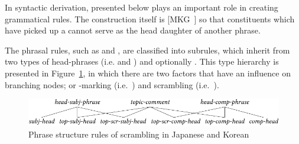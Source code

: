 
In syntactic derivation,  presented below plays an
important role in creating grammatical rules. The
construction itself is \mbox{[MKG ]} so that constituents
which have picked up a  cannot serve as the head daughter
of another  phrase.




\noindent The phrasal rules, such as  and
, are classified into subrules, which inherit from
two types of head-phrases (i.e.  and
) and optionally . This type
hierarchy is presented in Figure~\ref{fig:top:scr}, in which there are
two factors that have an influence on branching nodes; \wa or
\onun-marking (i.e.\ ) and scrambling (i.e.\ ).


\begin{figure}[!t]
\begin{center} 
\includegraphics[width=.9\textwidth]{pdf/top-scr.pdf}
\caption{Phrase structure rules of scrambling in Japanese and Korean}
\label{fig:top:scr}
\end{center}
\end{figure}


